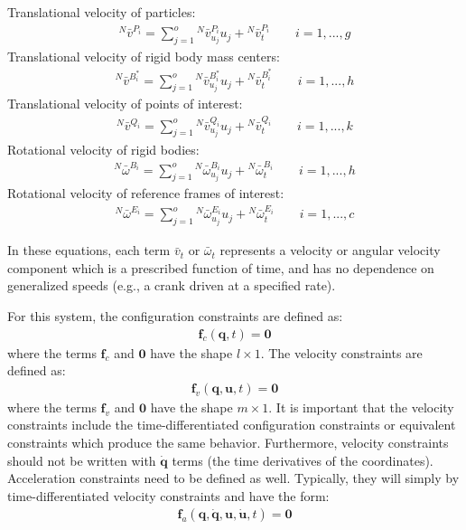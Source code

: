 \documentclass[smallcondensed,final]{svjour3}                     %
\begin{document}
Translational velocity of particles:
\begin{align}
\label{eq:particle_translational}
{^N}\bar{v}^{P_i} = \sum^o_{j=1} {^N}\bar{v}^{P_i}_{u_j} u_j + {^N}\bar{v}^{P_i}_t
\quad \quad i=1,...,g
\end{align}
Translational velocity of rigid body mass centers:
\begin{align}
\label{eq:rb_translational}
{^N}\bar{v}^{B_i^*} = \sum_{j=1}^o {^N}\bar{v}^{B_i^*}_{u_j} u_j +
{^N}\bar{v}^{B_i^*}_t \quad \quad i=1,...,h
\end{align}
Translational velocity of points of interest:
\begin{align}
\label{eq:points_translational}
{^N}\bar{v}^{Q_i} = \sum_{j=1}^o {^N}\bar{v}^{Q_i}_{u_j} u_j + {^N}\bar{v}^{Q_i}_t
\quad \quad i=1,...,k
\end{align}
Rotational velocity of rigid bodies:
\begin{align}
\label{eq:rb_rotational_bodies}
{^N}\bar{\omega}^{B_i} = \sum_{j=1}^o {^N}\bar{\omega}^{B_i}_{u_j} u_j +
{^N}\bar{\omega}^{B_i}_t \quad \quad i=1,...,h
\end{align}
Rotational velocity of reference frames of interest:
\begin{align}
\label{eq:rb_rotational_frames}
{^N}\bar{\omega}^{E_i} = \sum_{j=1}^o {^N}\bar{\omega}^{E_i}_{u_j} u_j +
{^N}\bar{\omega}^{E_i}_t \quad \quad i=1,...,c
\end{align}

In these equations, each term $\bar{v}_t$ or $\bar{\omega}_t$ represents a
velocity or angular velocity component which is a prescribed function of time,
and has no dependence on generalized speeds (e.g., a crank
driven at a specified rate).

For this system, the configuration constraints are defined as:
\begin{align}
\label{eq:configuration_constraints}
\mathbf{f}_c(\mathbf{q}, t) = \mathbf{0}
\end{align}
where the terms $\mathbf{f}_c$ and $\mathbf{0}$ have the shape $l \times 1$.
The velocity constraints are defined as:
\begin{align}
\label{eq:velocity_constraints}
\mathbf{f}_v(\mathbf{q}, \mathbf{u}, t) = \mathbf{0}
\end{align}
where the terms $\mathbf{f}_v$ and $\mathbf{0}$ have the shape $m \times 1$.
It is important that the velocity constraints include the time-differentiated
configuration constraints or equivalent constraints which produce the same
behavior.
Furthermore, velocity constraints should not be written with $\dot{\mathbf{q}}$
terms (the time derivatives of the coordinates).
Acceleration constraints need to be defined as well.
Typically, they will simply by time-differentiated velocity constraints and
have the form:
\begin{align}
\label{eq:acceleration_constraints}
\mathbf{f}_a(\mathbf{q}, \dot{\mathbf{q}}, \mathbf{u}, \dot{\mathbf{u}}, t) =
\mathbf{0}
\end{align}
\end{document}
